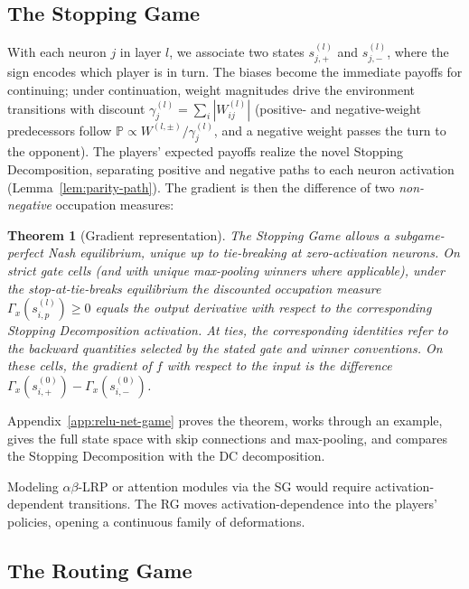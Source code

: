 \documentclass[twoside]{article}
\renewcommand{\P}{\mathbb{P}}
\newcommand{\1}{\mathbf{1}}
\newtheorem{theorem}{Theorem}
\begin{document}
\subsection{The Stopping Game}\label{sec:stopping}

With each neuron $j$ in layer $l$, we associate two states $s^{(l)}_{j,+}$ and $s^{(l)}_{j,-}$,
where the sign encodes which player is in turn.
The biases become the immediate payoffs for continuing; under continuation, weight magnitudes drive
the environment transitions with discount $\gamma_j^{(l)} = \sum_i |W_{ij}^{(l)}|$ (positive- and
negative-weight predecessors follow $\P \propto W^{(l,\pm)}/\gamma^{(l)}_j$, and a negative weight
passes the turn to the opponent).
The players' expected payoffs realize the novel Stopping Decomposition, separating positive and
negative paths to each neuron activation (Lemma~\ref{lem:parity-path}). The gradient is then the
difference of two \emph{non-negative} occupation measures:

\begin{theorem}[Gradient representation]\label{thm:gradient}
The Stopping Game allows a subgame-perfect Nash equilibrium, unique up to tie-breaking at
zero-activation neurons.
On strict gate cells (and with unique max-pooling winners where applicable), under the stop-at-tie-breaks equilibrium the discounted occupation measure $\Gamma_x(s_{i,p}^{(l)})
    \ge 0$ equals the output derivative with respect to the corresponding \emph{Stopping Decomposition}
activation. At ties, the corresponding identities refer to the backward quantities selected by the stated gate and winner conventions.
On these cells, the gradient of $f$ with respect to the input is the difference $\Gamma_x(s_{i,+}^{(0)}) -
    \Gamma_x(s_{i,-}^{(0)})$.
\end{theorem}
Appendix~\ref{app:relu-net-game} proves the theorem, works through an example, gives the full state
space with skip connections and max-pooling, and compares the Stopping Decomposition with the
\ac{DC} decomposition.

Modeling $\alpha\beta$-\ac{LRP} or attention modules via the \ac{SG} would require
activation-dependent transitions. The \ac{RG} moves activation-dependence into the players'
policies, opening a continuous family of deformations.

\subsection{The Routing Game}\label{sec:routing}
\end{document}
